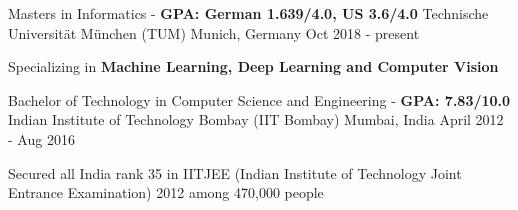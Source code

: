 \begin{cventries}
	\cventry
	{Masters in Informatics - \textbf{GPA: German 1.639/4.0, US 3.6/4.0}} %
	{Technische Universität München (TUM)} %
	{Munich, Germany} %
	{Oct 2018 - present} %
	{
		\begin{cvitems}
			\item {Specializing in \textbf{Machine Learning, Deep Learning and Computer Vision}}
		\end{cvitems}
    }
  	\cventry
    {Bachelor of Technology in Computer Science and Engineering - \textbf{GPA: 7.83/10.0}} %
    {Indian Institute of Technology Bombay (IIT Bombay)} %
    {Mumbai, India} %
    {April 2012 - Aug 2016} %
    {
		\begin{cvitems}
			\item {Secured all India rank 35 in IITJEE (Indian Institute of Technology Joint Entrance Examination) 2012 among 470,000 people}
		\end{cvitems}
    }
\end{cventries}
